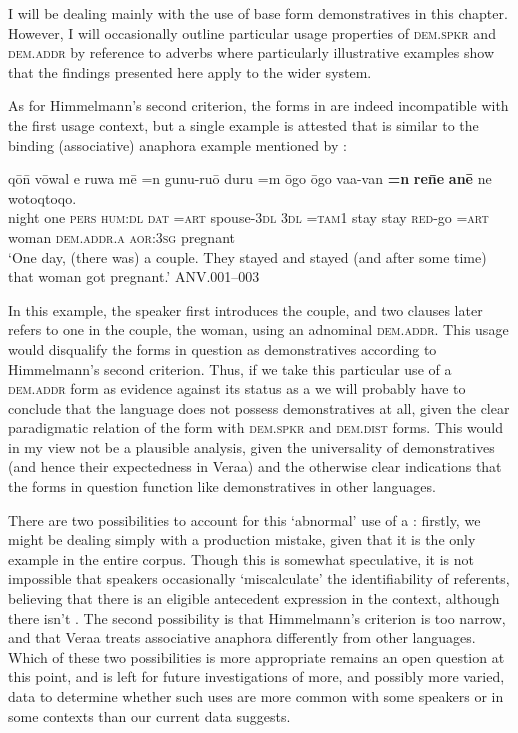 \documentclass[output=paper
,modfonts
,nonflat]{langsci/langscibook}
\begin{document}
\noindent
I will be dealing mainly with the use of base form demonstratives in this chapter. However, I will occasionally outline particular usage properties of \textsc{dem.spkr} and \textsc{dem.addr} by reference to adverbs where particularly illustrative examples show that the findings presented here apply to the wider  system.

As for Himmelmann's second criterion, the forms in  are indeed incompatible with the first usage context, but a single example is attested that is similar to the binding (associative) anaphora example mentioned by \cite[210]{Himmelmann1996}:

\ea \label{ex2}
\gll		q\=o\=n 		v\=owal 	e 		ruwa		m\=e	=n 	gunu-ru\=o	duru	=m		{\textquotesingle}\=ogo	{\textquotesingle}\=ogo	vaa-van	\textbf{=n}	\textbf{re\=ne}		\textbf{an\=e}		ne			wotoqtoqo.  \\
night		one		\textsc{pers}	\textsc{hum:dl}	\textsc{dat}	\textsc{=art}	spouse-\textsc{3dl} \textsc{3dl}	\textsc{=tam1}	stay	stay	\textsc{red}-go \textsc{=art}	woman	\textsc{\textsc{dem.addr.a}}	\textsc{aor:3sg} pregnant	\\
\glt	`One day, (there was) a couple. They stayed and stayed (and after some time) that woman got pregnant.'			\hfill{ANV.001--003}
\z

\noindent
In this example, the speaker first introduces the couple, and two clauses later refers to one in the couple, the woman,  using an adnominal \textsc{dem.addr}. This usage would disqualify the forms in question as demonstratives according to Himmelmann's second criterion. Thus, if we take this particular use of a \textsc{dem.addr} form as evidence against its status as a  we will probably have to conclude that the language does not possess demonstratives at all, given the clear paradigmatic relation of the form with \textsc{dem.spkr} and \textsc{dem.dist} forms. This would in my view not be a plausible analysis, given the universality of demonstratives (and hence their expectedness in Vera{\textquotesingle}a) and the otherwise clear indications that the forms in question function like demonstratives in other languages. 

There are two possibilities to account for this `abnormal' use of a : firstly, we might be dealing simply with a production mistake, given that it is the only example in the entire corpus. Though this is somewhat speculative, it is not impossible that speakers occasionally `miscalculate' the identifiability of referents, believing that there is an eligible antecedent expression in the  context, although there isn't \citep[72]{Ariel1990}. The second possibility is that Himmelmann's criterion is too narrow, and that Vera{\textquotesingle}a treats associative anaphora differently from other languages. Which of these two possibilities is more appropriate remains an open question at this point, and is left for future investigations of more, and possibly more varied,  data to determine whether such uses are more common with some speakers or in some contexts than our current data suggests.
\end{document}

